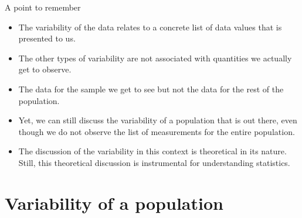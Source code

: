 \documentclass[10pt,handout]{beamer}\usepackage[]{graphicx}\usepackage[]{color}
\begin{document}
\begin{frame}{A point to remember}
	
	\begin{itemize}[<+->]
		
		\item The variability of the data relates to a concrete list of data values that is presented to us. 
		\item The other types of variability are
		not associated with quantities we actually get to observe. 
		\item  The data for
		the sample we get to see but not the data for the rest of the
		population. 
		\item Yet, we can still discuss the variability of a population
		that is out there, even though we do not observe the list of
		measurements for the entire population. 
		\item The discussion of the variability in this context
		is theoretical in its nature. Still, this theoretical discussion is
		instrumental for understanding statistics.
	\end{itemize}
	
\end{frame}



\section{Variability of a population}
\end{document}
